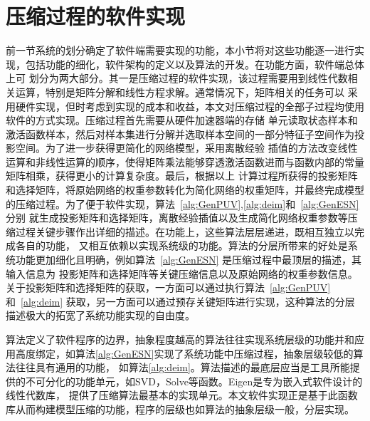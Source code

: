 \section{压缩过程的软件实现}
前一节系统的划分确定了软件端需要实现的功能，本小节将对这些功能逐一进行实现，包括功能的细化，软件架构的定义以及算法的开发。在功能方面，软件端总体上可
划分为两大部分。其一是压缩过程的软件实现，该过程需要用到线性代数相关运算，特别是矩阵分解和线性方程求解。通常情况下，矩阵相关的任务可以
采用硬件实现，但时考虑到实现的成本和收益，本文对压缩过程的全部子过程均使用软件的方式实现。压缩过程首先需要从硬件加速器端的存储
单元读取状态样本和激活函数样本，然后对样本集进行分解并选取样本空间的一部分特征子空间作为投影空间。为了进一步获得更简化的网络模型，采用离散经验
插值的方法改变线性运算和非线性运算的顺序，使得矩阵乘法能够穿透激活函数进而与函数内部的常量矩阵相乘，获得更小的计算复杂度。最后，根据以上
计算过程所获得的投影矩阵和选择矩阵，将原始网络的权重参数转化为简化网络的权重矩阵，并最终完成模型的压缩过程。为了便于软件实现，算法~\ref{alg:GenPUV},\ref{alg:deim}和~\ref{alg:GenESN}分别
就生成投影矩阵和选择矩阵，离散经验插值以及生成简化网络权重参数等压缩过程关键步骤作出详细的描述。在功能上，这些算法层层递进，既相互独立以完成各自的功能，
又相互依赖以实现系统级的功能。算法的分层所带来的好处是系统功能更加细化且明确，例如算法~\ref{alg:GenESN} 是压缩过程中最顶层的描述，其输入信息为
投影矩阵和选择矩阵等关键压缩信息以及原始网络的权重参数信息。关于投影矩阵和选择矩阵的获取，一方面可以通过执行算法~\ref{alg:GenPUV} 和~\ref{alg:deim} 
获取，另一方面可以通过预存关键矩阵进行实现，这种算法的分层描述极大的拓宽了系统功能实现的自由度。


算法定义了软件程序的边界，抽象程度越高的算法往往实现系统层级的功能并和应用高度绑定，如算法\ref{alg:GenESN}实现了系统功能中压缩过程，抽象层级较低的算法往往具有通用的功能，
如算法\ref{alg:deim}。算法描述的最底层应当是工具所能提供的不可分化的功能单元，如SVD，Solve等函数。Eigen是专为嵌入式软件设计的线性代数库，
提供了压缩算法最基本的实现单元。本文软件实现正是基于此函数库从而构建模型压缩的功能，程序的层级也如算法的抽象层级一般，分层实现。

